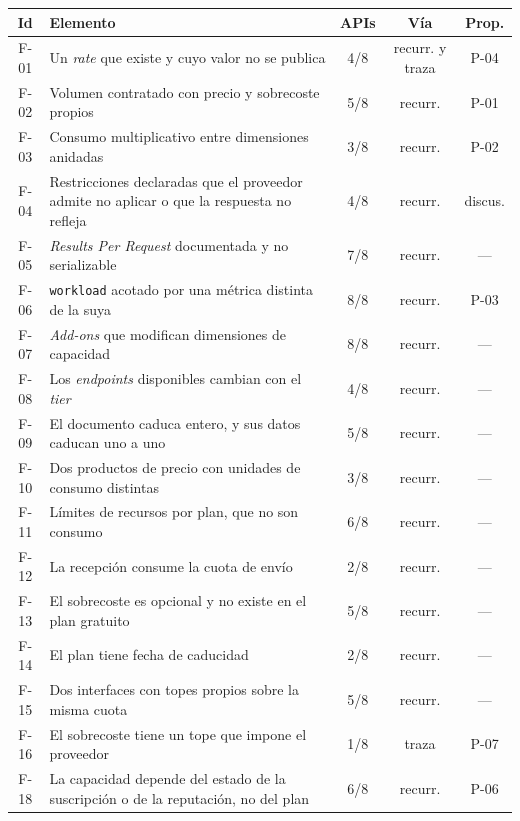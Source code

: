 \begin{table}[tbp]
\centering
\footnotesize
\setlength{\tabcolsep}{3pt}
\renewcommand{\arraystretch}{0.85}
\begin{tabular}{|c|>{\raggedright\arraybackslash}p{}|c|c|c|}
\hline
\textbf{Id} & \textbf{Elemento} & \textbf{APIs} & \textbf{Vía} & \textbf{Prop.} \\
\hline
F-01 & Un \textit{rate} que existe y cuyo valor no se publica & 4/8 & recurr. y traza & P-04 \\
\hline
F-02 & Volumen contratado con precio y sobrecoste propios & 5/8 & recurr. & P-01 \\
\hline
F-03 & Consumo multiplicativo entre dimensiones anidadas & 3/8 & recurr. & P-02 \\
\hline
F-04 & Restricciones declaradas que el proveedor admite no aplicar o que la respuesta no refleja & 4/8 & recurr. & discus. \\
\hline
F-05 & \textit{Results Per Request} documentada y no serializable & 7/8 & recurr. & --- \\
\hline
F-06 & \texttt{workload} acotado por una métrica distinta de la suya & 8/8 & recurr. & P-03 \\
\hline
F-07 & \textit{Add-ons} que modifican dimensiones de capacidad & 8/8 & recurr. & --- \\
\hline
F-08 & Los \textit{endpoints} disponibles cambian con el \textit{tier} & 4/8 & recurr. & --- \\
\hline
F-09 & El documento caduca entero, y sus datos caducan uno a uno & 5/8 & recurr. & --- \\
\hline
F-10 & Dos productos de precio con unidades de consumo distintas & 3/8 & recurr. & --- \\
\hline
F-11 & Límites de recursos por plan, que no son consumo & 6/8 & recurr. & --- \\
\hline
F-12 & La recepción consume la cuota de envío & 2/8 & recurr. & --- \\
\hline
F-13 & El sobrecoste es opcional y no existe en el plan gratuito & 5/8 & recurr. & --- \\
\hline
F-14 & El plan tiene fecha de caducidad & 2/8 & recurr. & --- \\
\hline
F-15 & Dos interfaces con topes propios sobre la misma cuota & 5/8 & recurr. & --- \\
\hline
F-16 & El sobrecoste tiene un tope que impone el proveedor & 1/8 & traza & P-07 \\
\hline
F-18 & La capacidad depende del estado de la suscripción o de la reputación, no del plan & 6/8 & recurr. & P-06 \\

\end{tabular}
\end{table}
